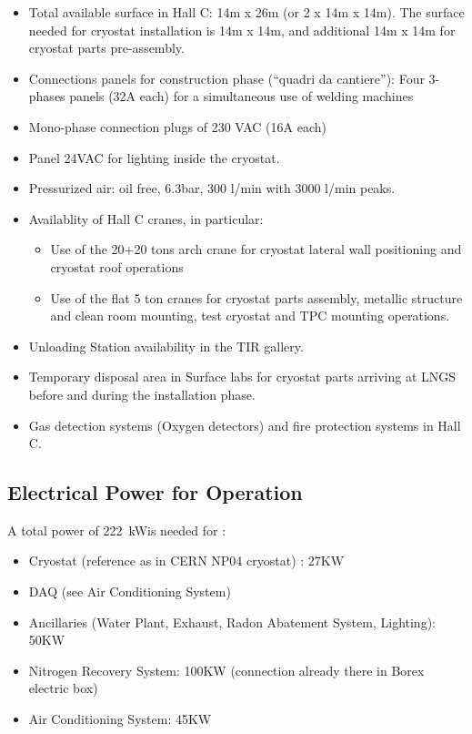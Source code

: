 \begin{itemize}

\item Total available surface in Hall C: 14m x 26m (or 2 x 14m x 14m). The surface needed for cryostat installation is 14m x 14m, and additional 14m x 14m for cryostat parts pre-assembly. 
\item Connections panels for construction phase (“quadri da cantiere”): Four 3-phases panels (32A each) for a simultaneous use of welding machines
\item Mono-phase connection plugs of 230 VAC (16A each)
\item Panel 24VAC for lighting inside the cryostat.
\item Pressurized air: oil free, 6.3bar, 300 l/min with 3000 l/min peaks.
\item Availablity of Hall C cranes, in particular:
\begin{itemize}[label=-]
\item Use of the 20+20 tons arch crane for cryostat lateral wall positioning and cryostat roof operations
\item Use of the flat 5 ton cranes for cryostat parts assembly, metallic structure and clean room mounting, test cryostat and TPC mounting operations.
\end{itemize}
\item Unloading Station availability in the TIR gallery.
\item Temporary disposal area in Surface labs for cryostat parts arriving at LNGS before and during the installation phase. 
\item Gas detection systems (Oxygen detectors) and fire protection systems in Hall C.
\end{itemize}

\subsection{Electrical Power for \DSks Operation}
\label{sec:ElectricalPower}

\newcommand{\TotalPowerConsumption}{\SI{222}{\kW}}
\newcommand{\TotalUPSPowerConsumption}{\SI{85}{\kW}}

A total power of \TotalPowerConsumption is needed for \DSks:

\begin{itemize}
\item Cryostat (reference as in CERN NP04 cryostat) : 27KW 
\item DAQ (see Air Conditioning System) 
\item Ancillaries (Water Plant, Exhaust, Radon Abatement System, Lighting): 50KW 
\item Nitrogen Recovery System: 100KW (connection already there in Borex electric box)
\item Air Conditioning System: 45KW 
\end{itemize}
\vspace{\baselineskip}

